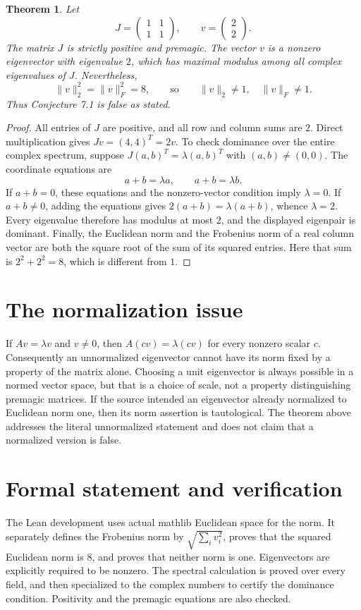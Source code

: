 \documentclass[11pt]{article}
\newtheorem{theorem}{Theorem}
\begin{document}
\begin{theorem}
Let
\[
 J=\begin{pmatrix}1&1\\1&1\end{pmatrix},\qquad
 v=\begin{pmatrix}2\\2\end{pmatrix}.
\]
The matrix $J$ is strictly positive and premagic. The vector $v$ is a
nonzero eigenvector with eigenvalue $2$, which has maximal modulus among
all complex eigenvalues of $J$. Nevertheless,
\[
 \|v\|_2^2=\|v\|_F^2=8,
 \qquad\text{so}\qquad \|v\|_2\ne1,\quad \|v\|_F\ne1.
\]
Thus Conjecture 7.1 is false as stated.
\end{theorem}
\begin{proof}
All entries of $J$ are positive, and all row and column sums are $2$.
Direct multiplication gives $Jv=(4,4)^T=2v$. To check dominance over the
entire complex spectrum, suppose $J(a,b)^T=\lambda(a,b)^T$ with
$(a,b)\ne(0,0)$. The coordinate equations are
\[
 a+b=\lambda a,\qquad a+b=\lambda b.
\]
If $a+b=0$, these equations and the nonzero-vector condition imply
$\lambda=0$. If $a+b\ne0$, adding the equations gives
$2(a+b)=\lambda(a+b)$, whence $\lambda=2$. Every eigenvalue therefore has
modulus at most $2$, and the displayed eigenpair is dominant. Finally,
the Euclidean norm and the Frobenius norm of a real column vector are
both the square root of the sum of its squared entries. Here that sum is
$2^2+2^2=8$, which is different from $1$.
\end{proof}

\section{The normalization issue}
If $Av=\lambda v$ and $v\ne0$, then $A(cv)=\lambda(cv)$ for every nonzero
scalar $c$. Consequently an unnormalized eigenvector cannot have its norm
fixed by a property of the matrix alone. Choosing a unit eigenvector is
always possible in a normed vector space, but that is a choice of scale,
not a property distinguishing premagic matrices. If the source intended
an eigenvector already normalized to Euclidean norm one, then its norm
assertion is tautological. The theorem above addresses the literal
unnormalized statement and does not claim that a normalized version is
false.

\section{Formal statement and verification}
The Lean development uses actual mathlib Euclidean space for the norm.
It separately defines the Frobenius norm by
$\sqrt{\sum_i v_i^2}$, proves that the squared Euclidean norm is $8$,
and proves that neither norm is one. Eigenvectors are explicitly required
to be nonzero. The spectral calculation is proved over every field, and
then specialized to the complex numbers to certify the dominance
condition. Positivity and the premagic equations are also checked.
\end{document}
